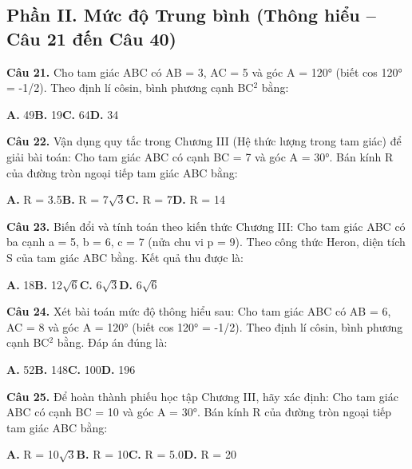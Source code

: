 \documentclass[11pt,a4paper]{article}
\begin{document}
\subsection*{\color{accent} Phần II. Mức độ Trung bình (Thông hiểu -- Câu 21 đến Câu 40)}
\textbf{\color{primary} Câu 21.} Cho tam giác ABC có AB = 3, AC = 5 và góc A = 120° (biết cos 120° = -1/2). Theo định lí côsin, bình phương cạnh BC$^2$ bằng:\par
\hspace*{1.5em}\textbf{A.} 49\quad\quad \textbf{B.} 19\quad\quad \textbf{C.} 64\quad\quad \textbf{D.} 34\par\vspace{2pt}
\textbf{\color{primary} Câu 22.} Vận dụng quy tắc trong Chương III (Hệ thức lượng trong tam giác) để giải bài toán: Cho tam giác ABC có cạnh BC = 7 và góc A = 30°. Bán kính R của đường tròn ngoại tiếp tam giác ABC bằng:\par
\hspace*{1.5em}\textbf{A.} R = 3.5\quad\quad \textbf{B.} R = 7$\sqrt{3}$\quad\quad \textbf{C.} R = 7\quad\quad \textbf{D.} R = 14\par\vspace{2pt}
\textbf{\color{primary} Câu 23.} Biến đổi và tính toán theo kiến thức Chương III: Cho tam giác ABC có ba cạnh a = 5, b = 6, c = 7 (nửa chu vi p = 9). Theo công thức Heron, diện tích S của tam giác ABC bằng. Kết quả thu được là:\par
\hspace*{1.5em}\textbf{A.} 18\quad\quad \textbf{B.} 12$\sqrt{6}$\quad\quad \textbf{C.} 6$\sqrt{3}$\quad\quad \textbf{D.} 6$\sqrt{6}$\par\vspace{2pt}
\textbf{\color{primary} Câu 24.} Xét bài toán mức độ thông hiểu sau: Cho tam giác ABC có AB = 6, AC = 8 và góc A = 120° (biết cos 120° = -1/2). Theo định lí côsin, bình phương cạnh BC$^2$ bằng. Đáp án đúng là:\par
\hspace*{1.5em}\textbf{A.} 52\quad\quad \textbf{B.} 148\quad\quad \textbf{C.} 100\quad\quad \textbf{D.} 196\par\vspace{2pt}
\textbf{\color{primary} Câu 25.} Để hoàn thành phiếu học tập Chương III, hãy xác định: Cho tam giác ABC có cạnh BC = 10 và góc A = 30°. Bán kính R của đường tròn ngoại tiếp tam giác ABC bằng:\par
\hspace*{1.5em}\textbf{A.} R = 10$\sqrt{3}$\quad\quad \textbf{B.} R = 10\quad\quad \textbf{C.} R = 5.0\quad\quad \textbf{D.} R = 20\par\vspace{2pt}
\end{document}
